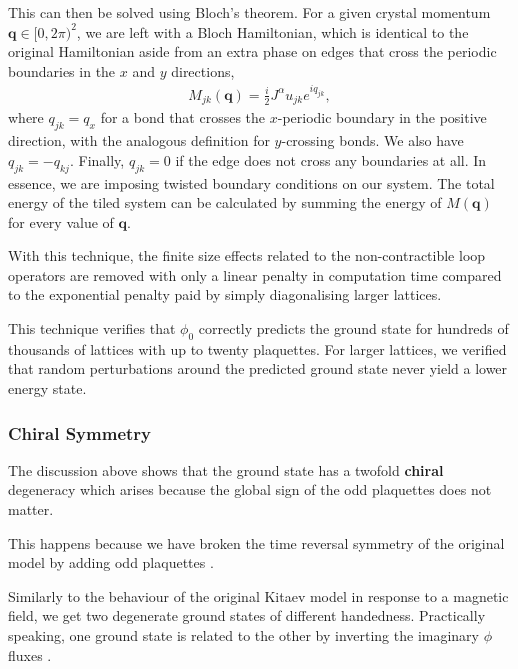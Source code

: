 This can then be solved using Bloch's theorem. For a given crystal momentum \(\textbf{q} \in [0,2\pi)^2\), we are left with a Bloch Hamiltonian, which is identical to the original Hamiltonian aside from an extra phase on edges that cross the periodic boundaries in the \(x\) and \(y\) directions, \[\begin{aligned}
    M_{jk}(\textbf{q}) =  \frac{i}{2} J^{\alpha} u_{jk} e^{i q_{jk}},\end{aligned}\] where \(q_{jk} = q_x\) for a bond that crosses the \(x\)-periodic boundary in the positive direction, with the analogous definition for \(y\)-crossing bonds. We also have \(q_{jk} = -q_{kj}\). Finally, \(q_{jk} = 0\) if the edge does not cross any boundaries at all. In essence, we are imposing twisted boundary conditions on our system. The total energy of the tiled system can be calculated by summing the energy of \(M( \textbf{q})\) for every value of \(\textbf{q}\).

With this technique, the finite size effects related to the non-contractible loop operators are removed with only a linear penalty in computation time compared to the exponential penalty paid by simply diagonalising larger lattices.

This technique verifies that \(\phi_0\) correctly predicts the ground state for hundreds of thousands of lattices with up to twenty plaquettes. For larger lattices, we verified that random perturbations around the predicted ground state never yield a lower energy state.

\hypertarget{chiral-symmetry}{%
\subsubsection{Chiral Symmetry}\label{chiral-symmetry}}

The discussion above shows that the ground state has a twofold \textbf{chiral} degeneracy which arises because the global sign of the odd plaquettes does not matter.

This happens because we have broken the time reversal symmetry of the original model by adding odd plaquettes \autocite{Chua2011,yaoExactChiralSpin2007,ChuaPRB2011,Fiete2012,Natori2016,Wu2009,Peri2020,WangHaoranPRB2021}.

Similarly to the behaviour of the original Kitaev model in response to a magnetic field, we get two degenerate ground states of different handedness. Practically speaking, one ground state is related to the other by inverting the imaginary \(\phi\) fluxes \autocite{yaoExactChiralSpin2007}.

